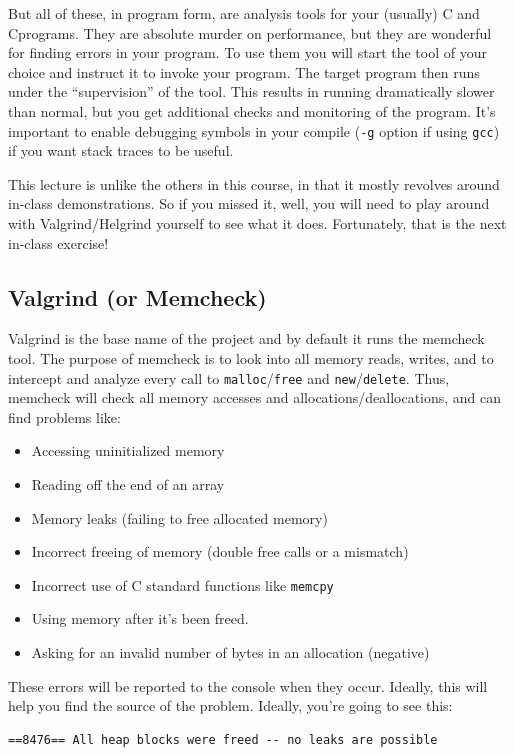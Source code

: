 \documentclass[a4paper]{report}
\newcommand{\CPP}{C\nolinebreak\hspace{-.05em}\raisebox{.4ex}{\tiny\bf +}\nolinebreak\hspace{-.10em}\raisebox{.4ex}{\tiny\bf +}}
\def\CPP{{C\nolinebreak[4]\hspace{-.05em}\raisebox{.4ex}{\tiny\bf ++}}}
\begin{document}
But all of these, in program form, are analysis tools for your (usually) C and \CPP programs. They are absolute murder on performance, but they are wonderful for finding errors in your program. To use them you will start the tool of your choice and instruct it to invoke your program. The target program then runs under the ``supervision'' of the tool. This results in running dramatically slower than normal, but you get additional checks and monitoring of the program. It's important to enable debugging symbols in your compile (\texttt{-g} option if using \texttt{gcc}) if you want stack traces to be useful.

This lecture is unlike the others in this course, in that it mostly revolves around in-class demonstrations. So if you missed it, well, you will need to play around with Valgrind/Helgrind yourself to see what it does. Fortunately, that is the next in-class exercise!

\subsection*{Valgrind (or Memcheck) }
Valgrind is the base name of the project and by default it runs the memcheck tool. The purpose of memcheck is to look into all memory reads, writes, and to intercept and analyze every call to \texttt{malloc}/\texttt{free} and \texttt{new}/\texttt{delete}. Thus, memcheck will check all memory accesses and allocations/deallocations, and can find problems like:
\begin{itemize}
	\item Accessing uninitialized memory
	\item Reading off the end of an array
	\item Memory leaks (failing to free allocated memory)
	\item Incorrect freeing of memory (double free calls or a mismatch)
	\item Incorrect use of C standard functions like \texttt{memcpy}
	\item Using memory after it's been freed.
	\item Asking for an invalid number of bytes in an allocation (negative\textinterrobang)
\end{itemize}

These errors will be reported to the console when they occur. Ideally, this will help you find the source of the problem. Ideally, you're going to see this:
\begin{verbatim}
==8476== All heap blocks were freed -- no leaks are possible
\end{verbatim}
\end{document}
